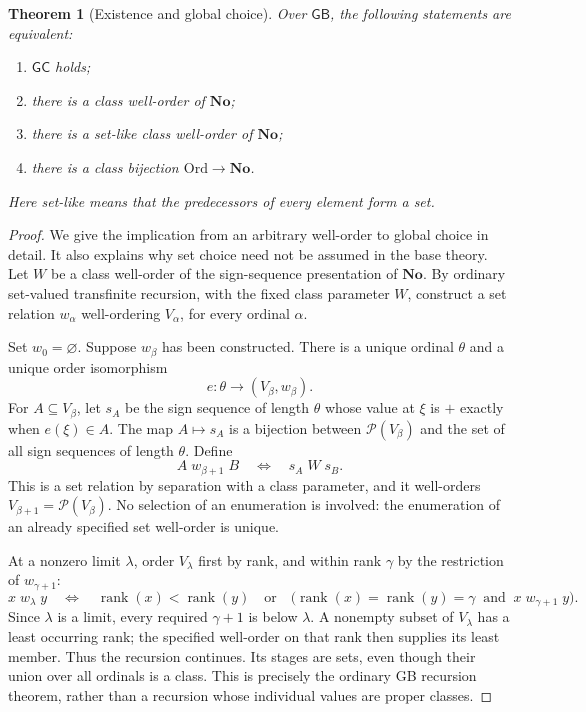 \documentclass[11pt]{article}
\newtheorem{theorem}{Theorem}[section]
\theoremstyle{definition}
\theoremstyle{remark}
\newcommand{\No}{\mathbf{No}}
\newcommand{\Ord}{\mathrm{Ord}}
\newcommand{\rk}{\operatorname{rank}}
\newcommand{\GB}{\mathsf{GB}}
\newcommand{\GC}{\mathsf{GC}}
\begin{document}
\begin{theorem}[Existence and global choice]
\label{swo:cf:choice}
Over \(\GB\), the following statements are equivalent:
\begin{enumerate}
  \item \(\GC\) holds;
  \item there is a class well-order of \(\No\);
  \item there is a set-like class well-order of \(\No\);
  \item there is a class bijection \(\Ord\to\No\).
\end{enumerate}
Here set-like means that the predecessors of every element form a set.
\end{theorem}

\begin{proof}
We give the implication from an arbitrary well-order to global choice in
detail.  It also explains why set choice need not be assumed in the base
theory.  Let \(W\) be a class well-order of the sign-sequence presentation of
\(\No\).  By ordinary set-valued transfinite recursion, with the fixed class
parameter \(W\), construct a set relation \(w_\alpha\) well-ordering
\(V_\alpha\), for every ordinal \(\alpha\).

Set \(w_0=\varnothing\).  Suppose \(w_\beta\) has been constructed.  There is
a unique ordinal \(\theta\) and a unique order isomorphism
\[
 e:\theta\longrightarrow(V_\beta,w_\beta).
\]
For \(A\subseteq V_\beta\), let \(s_A\) be the sign sequence of length
\(\theta\) whose value at \(\xi\) is \(+\) exactly when \(e(\xi)\in A\).
The map \(A\mapsto s_A\) is a bijection between \(\mathcal P(V_\beta)\)
and the set of all sign sequences of length \(\theta\).  Define
\[
 A\;w_{\beta+1}\;B\quad\Longleftrightarrow\quad s_A\;W\;s_B.
\]
This is a set relation by separation with a class parameter, and it
well-orders \(V_{\beta+1}=\mathcal P(V_\beta)\).  No selection of an
enumeration is involved: the enumeration of an already specified set
well-order is unique.

At a nonzero limit \(\lambda\), order \(V_\lambda\) first by rank, and
within rank \(\gamma\) by the restriction of \(w_{\gamma+1}\):
\[
 x\;w_\lambda\;y
 \quad\Longleftrightarrow\quad
 \rk(x)<\rk(y)\quad\text{or}\quad
 \bigl(\rk(x)=\rk(y)=\gamma\ \text{ and }\ x\;w_{\gamma+1}\;y\bigr).
\]
Since \(\lambda\) is a limit, every required \(\gamma+1\) is below
\(\lambda\).  A nonempty subset of \(V_\lambda\) has a least occurring
rank; the specified well-order on that rank then supplies its least member.
Thus the recursion continues.  Its stages are sets, even though their union
over all ordinals is a class.  This is precisely the ordinary GB recursion
theorem, rather than a recursion whose individual values are proper classes.


\end{proof}
\end{document}
